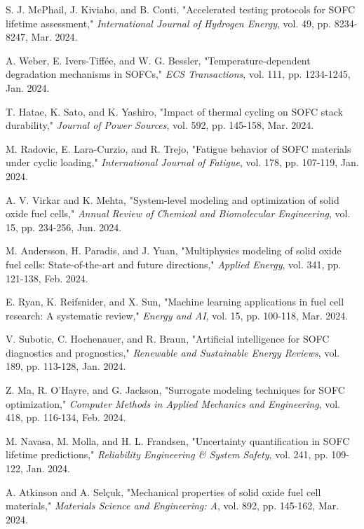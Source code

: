 \documentclass[conference]{IEEEtran}
\begin{document}
\begin{thebibliography}{99}
S. J. McPhail, J. Kiviaho, and B. Conti, "Accelerated testing protocols for SOFC lifetime assessment," \textit{International Journal of Hydrogen Energy}, vol. 49, pp. 8234-8247, Mar. 2024.

A. Weber, E. Ivers-Tiffée, and W. G. Bessler, "Temperature-dependent degradation mechanisms in SOFCs," \textit{ECS Transactions}, vol. 111, pp. 1234-1245, Jan. 2024.

T. Hatae, K. Sato, and K. Yashiro, "Impact of thermal cycling on SOFC stack durability," \textit{Journal of Power Sources}, vol. 592, pp. 145-158, Mar. 2024.

M. Radovic, E. Lara-Curzio, and R. Trejo, "Fatigue behavior of SOFC materials under cyclic loading," \textit{International Journal of Fatigue}, vol. 178, pp. 107-119, Jan. 2024.

A. V. Virkar and K. Mehta, "System-level modeling and optimization of solid oxide fuel cells," \textit{Annual Review of Chemical and Biomolecular Engineering}, vol. 15, pp. 234-256, Jun. 2024.

M. Andersson, H. Paradis, and J. Yuan, "Multiphysics modeling of solid oxide fuel cells: State-of-the-art and future directions," \textit{Applied Energy}, vol. 341, pp. 121-138, Feb. 2024.

E. Ryan, K. Reifsnider, and X. Sun, "Machine learning applications in fuel cell research: A systematic review," \textit{Energy and AI}, vol. 15, pp. 100-118, Mar. 2024.

V. Subotic, C. Hochenauer, and R. Braun, "Artificial intelligence for SOFC diagnostics and prognostics," \textit{Renewable and Sustainable Energy Reviews}, vol. 189, pp. 113-128, Jan. 2024.

Z. Ma, R. O'Hayre, and G. Jackson, "Surrogate modeling techniques for SOFC optimization," \textit{Computer Methods in Applied Mechanics and Engineering}, vol. 418, pp. 116-134, Feb. 2024.

M. Navasa, M. Molla, and H. L. Frandsen, "Uncertainty quantification in SOFC lifetime predictions," \textit{Reliability Engineering & System Safety}, vol. 241, pp. 109-122, Jan. 2024.

A. Atkinson and A. Selçuk, "Mechanical properties of solid oxide fuel cell materials," \textit{Materials Science and Engineering: A}, vol. 892, pp. 145-162, Mar. 2024.


\end{thebibliography}
\end{document}
